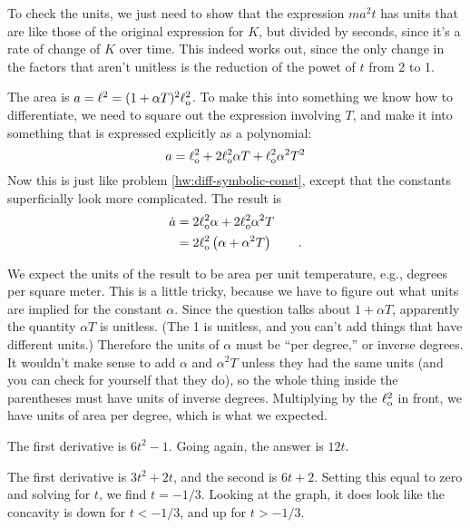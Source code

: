 To check the units, we just need to show that the expression $ma^2t$ has units that are like
those of the original expression for $K$, but divided by seconds, since it's a rate of
change of $K$ over time. This indeed works out, since the only change in the factors that
aren't unitless is the reduction of the powet of $t$ from 2 to 1.


The area is $a=\ell^2=(1+\alpha T)^2\ell_{\textup{o}}^2$. To make this into something we know how
to differentiate, we need to square out the expression involving $T$, and make it into something
that is expressed explicitly as a polynomial:
\begin{equation*}
  a=\ell_{\textup{o}}^2+2\ell_{\textup{o}}^2\alpha T+\ell_{\textup{o}}^2\alpha^2T^2
\end{equation*}
Now this is just like problem \ref{hw:diff-symbolic-const}, except that the constants superficially
look more complicated. The result is
\begin{align*}
  \dot{a} &=2\ell_{\textup{o}}^2\alpha +2\ell_{\textup{o}}^2\alpha^2T \\
          &=2\ell_{\textup{o}}^2\left(\alpha +\alpha^2T\right) \qquad .
\end{align*}

We expect the units of the result to be area per unit temperature, e.g., degrees per square meter.
This is a little tricky, because we have to figure out what units are implied for the constant
$\alpha$. Since the question talks about $1+\alpha T$, apparently the quantity $\alpha T$ is unitless.
(The 1 is unitless, and you can't add things that have different units.) Therefore the units
of $\alpha$ must be ``per degree,'' or inverse degrees. It wouldn't make sense to add $\alpha$ and
$\alpha^2T$ unless they had the same units (and you can check for yourself that they do), so
the whole thing inside the parentheses must have units of inverse degrees. Multiplying by the
$\ell_{\textup{o}}^2$ in front, we have units of area per degree, which is what we expected.


The first derivative is $6t^2-1$. Going again, the answer is $12t$.


The first derivative is $3t^2+2t$, and the second is $6t+2$. Setting this equal to zero
and solving for $t$, we find $t=-1/3$. Looking at the graph, it does look like the concavity
is down for $t<-1/3$, and up for $t>-1/3$.
%

